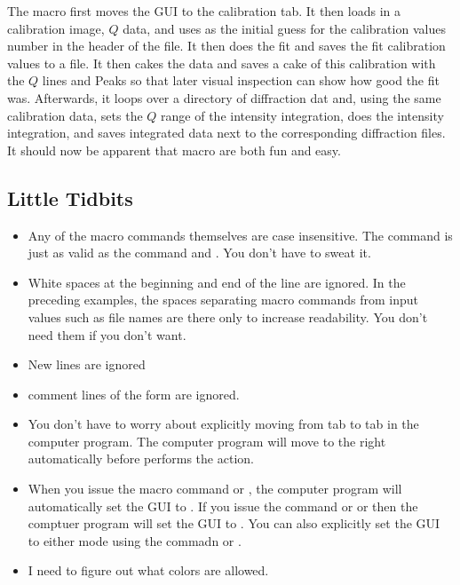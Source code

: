 The macro first moves the GUI to the calibration tab. It then loads in a calibration image, $Q$ data, and uses as the initial guess for the calibration values number in the header of the file. It then does the fit and saves the fit calibration values to a file.  It then cakes the data and saves a cake of this calibration with the $Q$ lines and Peaks so that later visual inspection can show how good the fit was. Afterwards, it loops over a directory of diffraction dat and, using the same calibration data, sets the $Q$ range of the intensity integration, does the intensity integration, and saves integrated data next to the corresponding diffraction files. It should now be apparent that macro are both fun and easy.

     
\subsection{Little Tidbits}\label{Little Tidbits}
\begin{itemize}
\item Any of the macro commands themselves are case insensitive. The command  is just as valid as the command  and . You don't have to sweat it. 
\item White spaces at the beginning and end of the line are ignored. In the preceding examples, the spaces separating macro commands from input values such as file names are there only to increase readability. You don't need them if you don't want.
\item New lines are ignored
\item comment lines of the form  are ignored.
\item You don't have to worry about explicitly moving from tab to tab in the computer program. The computer program will move to the right automatically before performs the action.
\item When you issue the macro command  or , the computer program will automatically set the GUI to . If you issue the command or  or  then the comptuer program will set the GUI to . You can also explicitly set the GUI to either mode using the commadn  or .
\item I need to figure out what colors are allowed.
\end{itemize}


